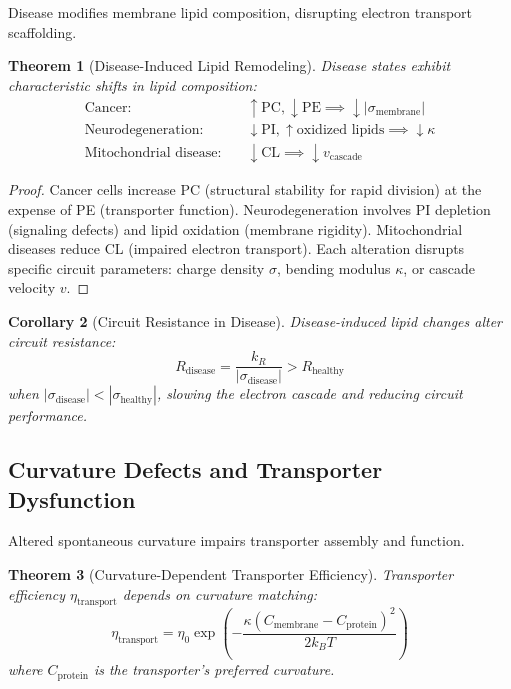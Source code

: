 \documentclass[11pt,twocolumn,a4paper]{article}
\newtheorem{theorem}{Theorem}[section]
\newtheorem{corollary}[theorem]{Corollary}
\theoremstyle{definition}
\theoremstyle{remark}
\begin{document}
Disease modifies membrane lipid composition, disrupting electron transport scaffolding.

\begin{theorem}[Disease-Induced Lipid Remodeling]
\label{thm:disease_lipid_remodeling}
Disease states exhibit characteristic shifts in lipid composition: 
\begin{align}
\text{Cancer:} &\quad \uparrow \text{PC}, \downarrow \text{PE} \implies \downarrow |\sigma_{\text{membrane}}| \\
\text{Neurodegeneration:} &\quad \downarrow \text{PI}, \uparrow \text{oxidized lipids} \implies \downarrow \kappa \\
\text{Mitochondrial disease:} &\quad \downarrow \text{CL} \implies \downarrow v_{\text{cascade}}
\end{align}
\end{theorem}

\begin{proof}
Cancer cells increase PC (structural stability for rapid division) at the expense of PE (transporter function). Neurodegeneration involves PI depletion (signaling defects) and lipid oxidation (membrane rigidity). Mitochondrial diseases reduce CL (impaired electron transport). Each alteration disrupts specific circuit parameters: charge density $\sigma$, bending modulus $\kappa$, or cascade velocity $v$.
\end{proof}

\begin{corollary}[Circuit Resistance in Disease]
\label{cor:disease_resistance}
Disease-induced lipid changes alter circuit resistance:
\begin{equation}
R_{\text{disease}} = \frac{k_R}{|\sigma_{\text{disease}}|} > R_{\text{healthy}}
\end{equation}
when $|\sigma_{\text{disease}}| < |\sigma_{\text{healthy}}|$, slowing the electron cascade and reducing circuit performance.
\end{corollary}

\subsection{Curvature Defects and Transporter Dysfunction}

Altered spontaneous curvature impairs transporter assembly and function.

\begin{theorem}[Curvature-Dependent Transporter Efficiency]
\label{thm:curvature_transporter}
Transporter efficiency $\eta_{\text{transport}}$ depends on curvature matching:
\begin{equation}
\eta_{\text{transport}} = \eta_0 \exp\left(-\frac{\kappa(C_{\text{membrane}} - C_{\text{protein}})^2}{2k_B T}\right)
\end{equation}
where $C_{\text{protein}}$ is the transporter's preferred curvature.
\end{theorem}
\end{document}

